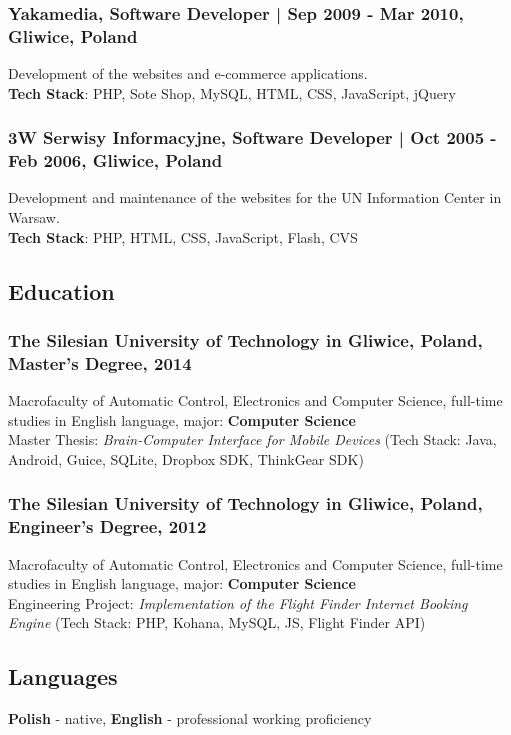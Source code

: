 \documentclass[8pt]{extarticle}
\begin{document}
      \subsubsection*{\normalsize{Yakamedia, Software Developer | Sep 2009 - Mar 2010, Gliwice, Poland}}
      Development of the websites and e-commerce applications.\\
      \textbf{Tech Stack}: PHP, Sote Shop, MySQL, HTML, CSS, JavaScript, jQuery

      \subsubsection*{\normalsize{3W Serwisy Informacyjne, Software Developer | Oct 2005 - Feb 2006, Gliwice, Poland}}
      Development and maintenance of the websites for the UN Information Center in Warsaw.\\
      \textbf{Tech Stack}: PHP, HTML, CSS, JavaScript, Flash, CVS

    \subsection*{\normalsize{Education}}

      \subsubsection*{\normalsize{The Silesian University of Technology in Gliwice, Poland, Master's Degree, 2014}}
      Macrofaculty of Automatic Control, Electronics and Computer Science,
      full-time studies in English language, major: \textbf{Computer Science}\\
      Master Thesis: \textit{Brain-Computer Interface for Mobile Devices}
      (Tech Stack: Java, Android, Guice, SQLite, Dropbox SDK, ThinkGear SDK)

      \subsubsection*{\normalsize{The Silesian University of Technology in Gliwice, Poland, Engineer's Degree, 2012}}
      Macrofaculty of Automatic Control, Electronics and Computer Science,
      full-time studies in English language, major: \textbf{Computer Science}\\
      Engineering Project: \textit{Implementation of the Flight Finder Internet Booking Engine}
      (Tech Stack: PHP, Kohana, MySQL, JS, Flight Finder API)

    \subsection*{\normalsize{Languages}}
    \textbf{Polish} - native, \textbf{English} - professional working proficiency
\end{document}
